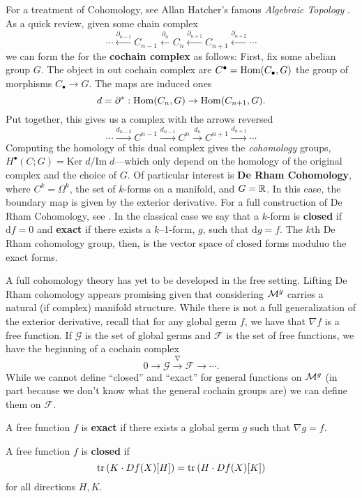 For a treatment of Cohomology, see Allan Hatcher's famous
\emph{Algebraic Topology} \cite{hatcherAlgebraic2002}. As a quick review, given
some chain complex
\[
  \cdots
  \xleftarrow{\partial_{n-1}}
  C_{n-1}
  \xleftarrow{\partial_{n}}
  C_{n}
  \xleftarrow{\partial_{n+1}}
  C_{n+1}
  \xleftarrow{\partial_{n+2}}
  \cdots
\]
we can form the for the \textbf{cochain complex} as follows: First, fix some
abelian group \(G\). The object in out cochain complex are
\(C^\bullet = \operatorname{Hom} (C_\bullet, G)\) the group of morphisms \(C_\bullet \to G\).
The maps are induced ones
\[
  d = \partial^* : \operatorname{Hom}(C_n,G) \to \operatorname{Hom}(C_{n+1},G).
\]
Put together, this gives us a complex with the arrows reversed
\[
  \cdots
  \xrightarrow{d_{n-2}}
  C^{n-1}
  \xrightarrow{d_{n-1}}
  C^{n}
  \xrightarrow{d_{n}}
  C^{n+1}
  \xrightarrow{d_{n+1}}
  \cdots
\]
Computing the homology of this dual complex gives the \emph{cohomology}
groups, \(H^\bullet (C; G)= \textrm{Ker}\;  d / \textrm{Im}\; d\)---which only
depend on the homology of the original complex and the choice of \(G\). Of
particular interest is \textbf{De Rham Cohomology}, where \(C^k = \Omega^k\), the
set of \(k\)-forms on a manifold, and \(G=\mathbb{R} \). In this case, the boundary map
is given by the exterior derivative. For a full construction of De Rham
Cohomology, see \cite{leeIntroduction2013}. In the classical case we say that a
\(k\)-form is \textbf{closed} if \(\text{d} f =0\) and \textbf{exact} if there
exists a \(k\)--1-form, \(g\), such that \(\text{d} g=f\). The \(k\)th De Rham
cohomology group, then, is the vector space of closed forms moduluo the exact
forms.

A full cohomology theory has yet to be developed in the free setting. Lifting
De Rham cohomology appears promising given that considering \(\mathcal{M}^{g} \) carries
a natural (if complex) manifold structure. While there is not a full
generalization of the exterior derivative, recall that for any global germ \(f\),
we have that \(\nabla f\) is a free function. If \(\mathcal{G}\) is the set of
global germs and \(\mathcal{F}\) is the set of free functions, we have the
beginning of a cochain complex
\[
  0 \rightarrow \mathcal{G} \xrightarrow{\nabla} \mathcal{F} \rightarrow \cdots.
\]
While we cannot define ``closed'' and ``exact'' for general functions on
\(\mathcal{M}^{g} \) (in part because we don't know what the general cochain groups are)
we can define them on \(\mathcal{F}\).
\begin{definition}[Exact]%
\label{def:exact}
  A free function \(f\) is \textbf{exact} if there exists a global germ \(g\)
  such that \(\nabla g = f\).
\end{definition}
\begin{definition}[Closed]%
\label{def:closed}
  A free function \(f\) is \textbf{closed} if
  \[
    \operatorname{tr} \left( K \cdot Df(X)[H] \right) = \operatorname{tr} \left( H \cdot Df(X)[K] \right)
  \]
  for all directions \(H,K\).
\end{definition}

